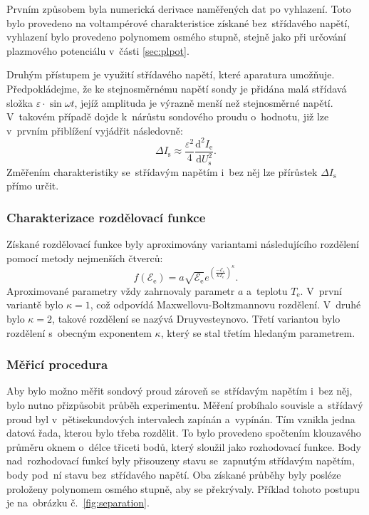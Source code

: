 \documentclass{protokol}
\newcommand\boltzmann{k}
\newcommand\iprobe{I_\mathrm{s}}
\newcommand\ielec{I_\mathrm{e}}
\newcommand\uprobe{U_\mathrm{s}}
\newcommand\didu{\frac{\mathrm d^2 \ielec}{\mathrm d \uprobe^2}}
\newcommand\enelec{\mathcal E_\mathrm{e}}
\newcommand\eedf{f(\enelec)}
\newcommand\ueedf{\varepsilon}
\newcommand\tempelec{T_\mathrm{e}}
\begin{document}
Prvním způsobem byla numerická derivace naměřených dat po vyhlazení.
Toto bylo provedeno na voltampérové charakteristice získané bez~střídavého
napětí, vyhlazení bylo provedeno polynomem osmého stupně,
stejně jako při určování plazmového potenciálu v~části \ref{sec:plpot}.

Druhým přístupem je využití střídavého napětí, které aparatura umožňuje.
Předpokládejme, že ke stejnosměrnému napětí sondy je přidána malá
střídavá složka $\ueedf\cdot\sin{\omega t}$,
jejíž amplituda je výrazně menší než stejnosměrné napětí.
V~takovém případě dojde k~nárůstu sondového proudu o~hodnotu,
již lze v~prvním přiblížení vyjádřit následovně:
\begin{equation}
	\label{eq:eedf-idiff}
	\Delta\iprobe \approx \frac{\ueedf^2}{4}\didu.
\end{equation}
Změřením charakteristiky se~střídavým napětím i~bez něj lze přírůstek
$\Delta\iprobe$ přímo určit.

\subsubsection{Charakterizace rozdělovací funkce}
Získané rozdělovací funkce byly aproximovány variantami následujícího
rozdělení pomocí metody nejmenších čtverců:
\begin{equation}
	\label{eq:model}
	\eedf = a \sqrt{\enelec}
		e^{(\frac{-\enelec}{\boltzmann\tempelec})^\kappa}.
\end{equation}
Aproximované parametry vždy zahrnovaly parametr $a$ a~teplotu $\tempelec$.
V~první variantě bylo $\kappa = 1$, což odpovídá Maxwellovu-Boltzmannovu
rozdělení.
V~druhé bylo $\kappa = 2$, takové rozdělení se nazývá Druy\-ve\-steynovo.
Třetí variantou bylo rozdělení s~obecným exponentem $\kappa$,
který se stal třetím hledaným parametrem.

\subsubsection{Měřicí procedura}
Aby bylo možno měřit sondový proud zároveň se~střídavým napětím i~bez něj,
bylo nutno přizpůsobit průběh experimentu.
Měření probíhalo souvisle a~střídavý proud byl v~pětisekundových intervalech
zapínán a~vypínán.
Tím vznikla jedna datová řada, kterou bylo třeba rozdělit.
To bylo provedeno spočtením klouzavého průměru oknem o~délce třiceti bodů,
který sloužil jako rozhodovací funkce.
Body nad~rozhodovací funkcí byly přisouzeny stavu se~zapnutým střídavým
napětím, body pod~ní stavu bez~střídavého napětí.
Oba získané průběhy byly posléze proloženy polynomem osmého stupně,
aby se překrývaly.
Příklad tohoto postupu je na~obrázku č.~\ref{fig:separation}.
\end{document}
